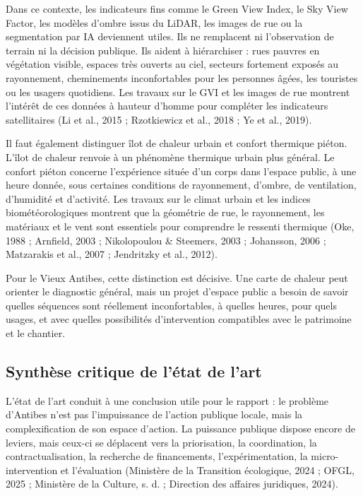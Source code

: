 \documentclass[11pt,a4paper]{report}
\begin{document}
Dans ce contexte, les indicateurs fins comme le Green View Index, le Sky View Factor, les modèles d'ombre issus du LiDAR, les images de rue ou la segmentation par IA deviennent utiles. Ils ne remplacent ni l'observation de terrain ni la décision publique. Ils aident à hiérarchiser : rues pauvres en végétation visible, espaces très ouverts au ciel, secteurs fortement exposés au rayonnement, cheminements inconfortables pour les personnes âgées, les touristes ou les usagers quotidiens. Les travaux sur le GVI et les images de rue montrent l'intérêt de ces données à hauteur d'homme pour compléter les indicateurs satellitaires (Li et al., 2015 ; Rzotkiewicz et al., 2018 ; Ye et al., 2019).

Il faut également distinguer îlot de chaleur urbain et confort thermique piéton. L'îlot de chaleur renvoie à un phénomène thermique urbain plus général. Le confort piéton concerne l'expérience située d'un corps dans l'espace public, à une heure donnée, sous certaines conditions de rayonnement, d'ombre, de ventilation, d'humidité et d'activité. Les travaux sur le climat urbain et les indices biométéorologiques montrent que la géométrie de rue, le rayonnement, les matériaux et le vent sont essentiels pour comprendre le ressenti thermique (Oke, 1988 ; Arnfield, 2003 ; Nikolopoulou \& Steemers, 2003 ; Johansson, 2006 ; Matzarakis et al., 2007 ; Jendritzky et al., 2012).

Pour le Vieux Antibes, cette distinction est décisive. Une carte de chaleur peut orienter le diagnostic général, mais un projet d'espace public a besoin de savoir quelles séquences sont réellement inconfortables, à quelles heures, pour quels usages, et avec quelles possibilités d'intervention compatibles avec le patrimoine et le chantier.

\subsection{Synthèse critique de l'état de l'art}

L'état de l'art conduit à une conclusion utile pour le rapport : le problème d'Antibes n'est pas l'impuissance de l'action publique locale, mais la complexification de son espace d'action. La puissance publique dispose encore de leviers, mais ceux-ci se déplacent vers la priorisation, la coordination, la contractualisation, la recherche de financements, l'expérimentation, la micro-intervention et l'évaluation (Ministère de la Transition écologique, 2024 ; OFGL, 2025 ; Ministère de la Culture, s. d. ; Direction des affaires juridiques, 2024).
\end{document}
